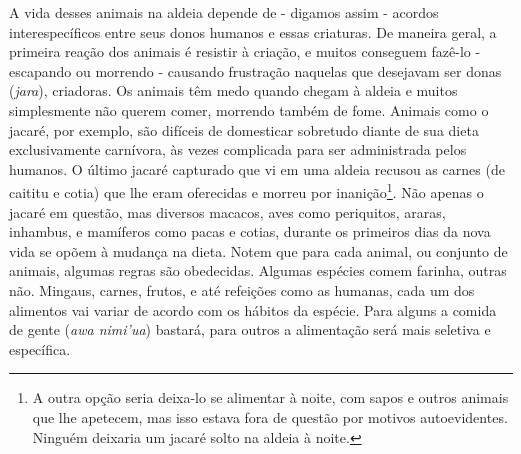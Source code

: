 A vida desses animais na aldeia depende de - digamos assim - acordos
interespecíficos entre seus donos humanos e essas criaturas. De maneira
geral, a primeira reação dos animais é resistir à criação, e muitos
conseguem fazê-lo - escapando ou morrendo - causando frustração naquelas
que desejavam ser donas (\emph{jara}), criadoras. Os animais têm medo
quando chegam à aldeia e muitos simplesmente não querem comer, morrendo
também de fome. Animais como o jacaré, por exemplo, são difíceis de
domesticar sobretudo diante de sua dieta exclusivamente carnívora, às
vezes complicada para ser administrada pelos humanos. O último jacaré
capturado que vi em uma aldeia recusou as carnes (de caititu e cotia)
que lhe eram oferecidas e morreu por inanição\footnote{A outra opção
  seria deixa-lo se alimentar à noite, com sapos e outros animais que
  lhe apetecem, mas isso estava fora de questão por motivos
  autoevidentes. Ninguém deixaria um jacaré solto na aldeia à noite.}.
Não apenas o jacaré em questão, mas diversos macacos, aves como
periquitos, araras, inhambus, e mamíferos como pacas e cotias, durante
os primeiros dias da nova vida se opõem à mudança na dieta. Notem que
para cada animal, ou conjunto de animais, algumas regras são obedecidas.
Algumas espécies comem farinha, outras não. Mingaus, carnes, frutos, e
até refeições como as humanas, cada um dos alimentos vai variar de
acordo com os hábitos da espécie. Para alguns a comida de gente
(\emph{awa nimi'ua}) bastará, para outros a alimentação será mais
seletiva e específica.

